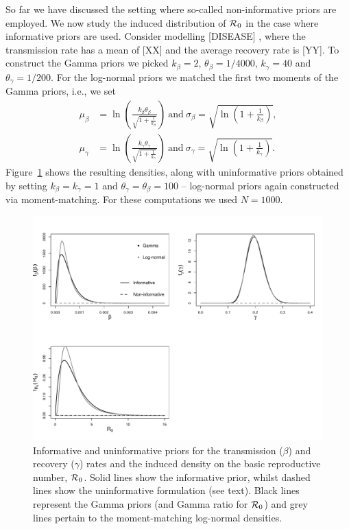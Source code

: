 \documentclass[alpha-refs]{wiley-article}
\newcommand{\rr}{ {\cal R}_0 }						%
\begin{document}
So far we have discussed the setting where so-called non-informative priors are employed.
We now study the induced distribution of $\rr$ in the case where informative priors are used. 
Consider modelling [DISEASE] , where the transmission rate has a mean of [XX] and the average recovery rate is [YY].
To construct the Gamma priors we picked $k_{\beta} = 2$, $\theta_{\beta} = 1/4000$, $k_{\gamma} = 40$ and $\theta_{\gamma} = 1/200$.
For the log-normal priors we matched the first two moments of the Gamma priors, i.e., we set
\begin{align*}
 \mu_{\beta} &= \ln \left( \frac{ k_{\beta} \theta_{\beta} }{\sqrt{1 + \frac{1}{k_{\beta}} }} \right) \:\text{and}\: \sigma_{\beta} = \sqrt{ \ln \left( 1 +  \frac{ 1}{ k_{\beta}} \right) }, \\
 \mu_{\gamma} &= \ln \left( \frac{ k_{\gamma} \theta_{\gamma} }{\sqrt{1 + \frac{1}{k_{\gamma}} }} \right) \:\text{and}\: \sigma_{\gamma} = \sqrt{ \ln \left( 1 +  \frac{ 1}{ k_{\gamma}} \right) }.
\end{align*}
Figure~\ref{fig:informative_priors_example} shows the resulting densities, along with uninformative priors obtained by setting $k_{\beta} = k_{\gamma} =  1$ and $\theta_{\gamma} = \theta_{\beta} = 100$ -- log-normal priors again constructed via moment-matching.
For these computations we used $N = 1000$.

\begin{figure}[bt]
\centering
\includegraphics[scale=0.4]{figures/informative_example.pdf}
\caption{Informative and uninformative priors for the transmission ($\beta$) and recovery ($\gamma$) rates and the induced density on the basic reproductive number, $\rr$.
Solid lines show the informative prior, whilst dashed lines show the uninformative formulation (see text).
Black lines represent the Gamma priors (and Gamma ratio for $\rr$) and grey lines pertain to the moment-matching log-normal densities.}
\label{fig:informative_priors_example}
\end{figure}
\end{document}
